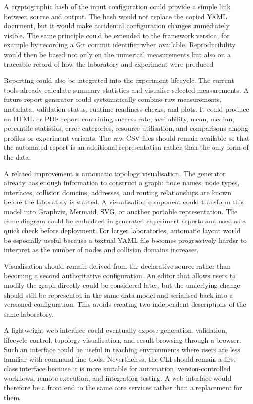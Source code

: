 A cryptographic hash of the input configuration could provide a simple link
between source and output. The hash would not replace the copied YAML document,
but it would make accidental configuration changes immediately visible. The
same principle could be extended to the framework version, for example by
recording a Git commit identifier when available. Reproducibility would then be
based not only on the numerical measurements but also on a traceable record of
how the laboratory and experiment were produced.

Reporting could also be integrated into the experiment lifecycle. The current
tools already calculate summary statistics and visualise selected measurements.
A future report generator could systematically combine raw measurements,
metadata, validation status, runtime readiness checks, and plots. It could
produce an HTML or PDF report containing success rate, availability, mean,
median, percentile statistics, error categories, resource utilisation, and
comparisons among profiles or experiment variants. The raw CSV files should
remain available so that the automated report is an additional representation
rather than the only form of the data.

A related improvement is automatic topology visualisation. The generator
already has enough information to construct a graph: node names, node types,
interfaces, collision domains, addresses, and routing relationships are known
before the laboratory is started. A visualisation component could transform
this model into Graphviz, Mermaid, SVG, or another portable representation. The
same diagram could be embedded in generated experiment reports and used as a
quick check before deployment. For larger laboratories, automatic layout would
be especially useful because a textual YAML file becomes progressively harder
to interpret as the number of nodes and collision domains increases.

Visualisation should remain derived from the declarative source rather than
becoming a second authoritative configuration. An editor that allows users to
modify the graph directly could be considered later, but the underlying change
should still be represented in the same data model and serialised back into a
versioned configuration. This avoids creating two independent descriptions of
the same laboratory.

A lightweight web interface could eventually expose generation, validation,
lifecycle control, topology visualisation, and result browsing through a
browser. Such an interface could be useful in teaching environments where
users are less familiar with command-line tools. Nevertheless, the CLI should
remain a first-class interface because it is more suitable for automation,
version-controlled workflows, remote execution, and integration testing. A web
interface would therefore be a front end to the same core services rather than
a replacement for them.

